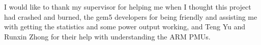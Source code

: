 I would like to thank my supervisor for helping me when I thought this project 
had crashed and burned, the gem5 developers for being friendly and assisting me 
with getting the statistics and some power output working, and Teng Yu and 
Runxin Zhong for their help with understanding the ARM PMUs.
